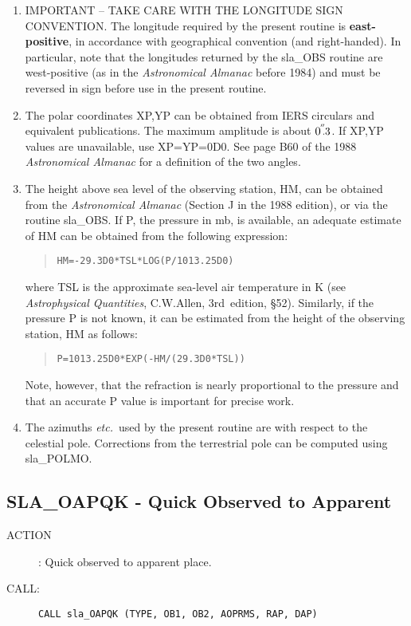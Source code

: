 \documentclass[11pt,twoside]{article}
\newcommand{\xlabel}[1]{}
\newcommand{\arcsec}[2] {\arcseci{#1}$\hspace{-0.4em}.#2$}
\newcommand{\arcsec}[2] {
      {$#1\hspace{-0.05em}^{'\hspace{-0.1em}'}\hspace{-0.4em}.#2$}
   }
\newcommand{\arcseci}[1] {$#1\hspace{-0.05em}$\raisebox{-0.5ex}
                         {$^{'\hspace{-0.1em}'}$}}
\renewcommand{\arcseci}[1] {$#1\hspace{-0.05em}^{'\hspace{-0.1em}'}$}
\newcommand{\tseci}[1]   {$#1$\mbox{$^{\rm s}$}}
\newcommand{\tsec}[2]    {\tseci{#1}$\hspace{-0.3em}.#2$}
\renewcommand{\tsec}[2] {$#1^{\rm s}\hspace{-0.3em}.#2$}
\newcommand{\routine}[3]
{\hbadness=10000
  \vbox
  {
    \rule{\textwidth}{0.3mm}\\
    {\Large {\bf #1} \hfill #2 \hfill {\bf #1}}\\
    \setlength{\oldspacing}{\topsep}
    \setlength{\topsep}{0.3ex}
    \begin{description}
      #3
    \end{description}
    \setlength{\topsep}{\oldspacing}
  }
}
\renewcommand{\routine}[3]
   {
      \subsection{#1\xlabel{#1} - #2\label{#1}}
       \begin{description}
         #3
       \end{description}
   }
\newcommand{\action}[1]
{\item[ACTION]: #1}
\newcommand{\action}[1]
   {\item[ACTION:] #1}
\newcommand{\call}[1]
{\item[CALL]: \hspace{0.4em}{\tt #1}}
\newlength{\oldspacing}
\renewcommand{\call}[1]
   {
    \item[CALL:] {\tt #1}
   }
\begin{document}
{\begin{enumerate}
        elsewhere.  It increases by exactly one second at the end of
        each UTC leap second, introduced in order to keep $\Delta$UT
        within $\pm$\tsec{0}{9}.
  \item IMPORTANT -- TAKE CARE WITH THE LONGITUDE SIGN CONVENTION.  The
        longitude required by the present routine is {\bf east-positive},
        in accordance with geographical convention (and right-handed).
        In particular, note that the longitudes returned by the
        sla\_OBS routine are west-positive (as in the {\it Astronomical
        Almanac}\/ before 1984) and must be reversed in sign before use
        in the present routine.
  \item The polar coordinates XP,YP can be obtained from IERS
        circulars and equivalent publications.  The
        maximum amplitude is about \arcsec{0}{3}.  If XP,YP values
        are unavailable, use XP=YP=0D0.  See page B60 of the 1988
        {\it Astronomical Almanac}\/ for a definition of the two angles.
  \item The height above sea level of the observing station, HM,
        can be obtained from the {\it Astronomical Almanac}\/ (Section J
        in the 1988 edition), or via the routine sla\_OBS.  If P,
        the pressure in mb, is available, an adequate
        estimate of HM can be obtained from the following expression:
        \begin{quote}
         {\tt HM=-29.3D0*TSL*LOG(P/1013.25D0)}
        \end{quote}
        where TSL is the approximate sea-level air temperature in K
        (see {\it Astrophysical Quantities}, C.W.Allen, 3rd~edition,
        \S 52).  Similarly, if the pressure P is not known,
        it can be estimated from the height of the observing
        station, HM as follows:
        \begin{quote}
         {\tt P=1013.25D0*EXP(-HM/(29.3D0*TSL))}
        \end{quote}
        Note, however, that the refraction is nearly proportional to the
        pressure and that an accurate P value is important for
        precise work.
  \item The azimuths {\it etc.}\ used by the present routine are with
        respect to the celestial pole.  Corrections from the terrestrial pole
        can be computed using sla\_POLMO.
 \end{enumerate}
}
\routine{SLA\_OAPQK}{Quick Observed to Apparent}
{
 \action{Quick observed to apparent place.}
 \call{CALL sla\_OAPQK (TYPE, OB1, OB2, AOPRMS, RAP, DAP)}
}
\end{document}
